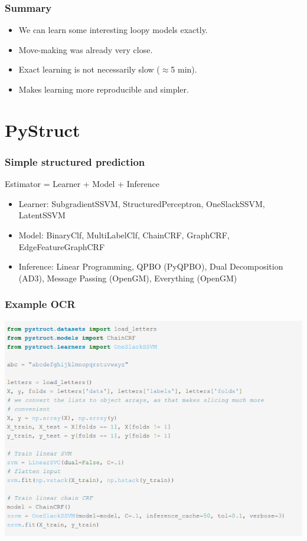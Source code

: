 \documentclass[final,ignorenonframetext,compress]{beamer}
\begin{document}
\begin{frame}
    \frametitle{Summary}
    \begin{itemize}
        \item We can learn some interesting loopy models exactly.
        \item Move-making was already very close.
        \item Exact learning is not necessarily slow ($\approx$5 min).
        \item Makes learning more reproducible and simpler.
    \end{itemize}
\end{frame}

\section{PyStruct}
    \begin{frame}
        \frametitle{Simple structured prediction}
        Estimator = Learner + Model + Inference\\

        \begin{itemize}
            \item<2-> Learner: SubgradientSSVM, StructuredPerceptron, OneSlackSSVM, LatentSSVM
            \item<2-> Model: BinaryClf, MultiLabelClf, ChainCRF, GraphCRF, EdgeFeatureGraphCRF
            \item<2-> Inference: Linear Programming, QPBO (PyQPBO), Dual Decomposition (AD3), Message Passing (OpenGM), Everything (OpenGM)
        \end{itemize}

    \end{frame}

    \begin{frame}
        \frametitle{Example OCR}
        \includegraphics[width=.7\linewidth]{images/code_letters}
    \end{frame}
\end{document}
